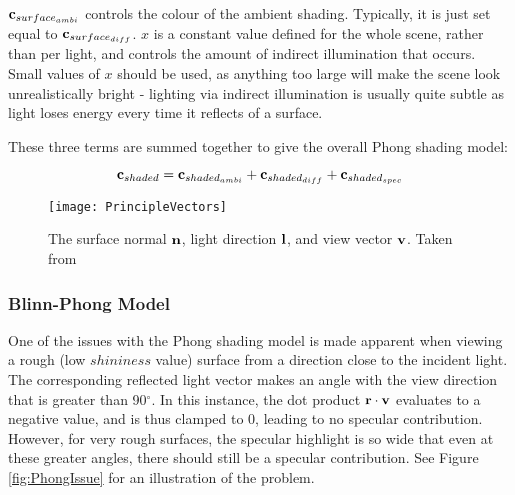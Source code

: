 \begin{math}\mathbf{c}_{surface_{ambi}}\end{math} controls the colour of the ambient shading. Typically, it is just set equal to \begin{math}\mathbf{c}_{surface_{diff}}\end{math}. \begin{math}x\end{math} is a constant value defined for the whole scene, rather than per light, and controls the amount of indirect illumination that occurs. Small values of \begin{math}x\end{math} should be used, as anything too large will make the scene look unrealistically bright - lighting via indirect illumination is usually quite subtle as light loses energy every time it reflects of a surface.

These three terms are summed together to give the overall Phong shading model:

\begin{equation}
	\mathbf{c}_{shaded} = \mathbf{c}_{shaded_{ambi}} + \mathbf{c}_{shaded_{diff}} + \mathbf{c}_{shaded_{spec}}
\end{equation}

\begin{figure}[h]
	\centering
	\texttt{[image: PrincipleVectors]}
	\caption{The surface normal \begin{math}\mathbf{n}\end{math}, light direction \begin{math}\mathbf{l}\end{math}, and view vector \begin{math}\mathbf{v}\end{math}. Taken from~\cite{RTR4}}
	\label{fig:PrincipleVectors}
\end{figure}

\subsubsection{Blinn-Phong Model}

One of the issues with the Phong shading model is made apparent when viewing a rough (low \begin{math}shininess\end{math} value) surface from a direction close to the incident light. The corresponding reflected light vector makes an angle with the view direction that is greater than 90$^{\circ}$. In this instance, the dot product \begin{math}\mathbf{r}\cdot\mathbf{v}\end{math} evaluates to a negative value, and is thus clamped to 0, leading to no specular contribution. However, for very rough surfaces, the specular highlight is so wide that even at these greater angles, there should still be a specular contribution. See Figure \ref{fig:PhongIssue} for an illustration of the problem.

